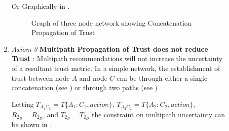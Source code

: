 \begin{itemize}
\begin{enumerate}
\begin{enumerate}
            Or Graphically in .
            \begin{figure}[c!]
              
              \caption{Graph of three node network showing Concatenation Propagation of
              Trust}
              \label{liu2006_concatenation_propagation-dot}
            \end{figure}
          \item \label{Axiom3} \emph{Axiom 3} \textbf{Multipath Propagation of Trust does not reduce Trust} :
            Multipath recommendations will not increase the uncertainty of a
            resultant trust metric. In a simple network, the establishment of
            trust between node \(A\) and node \(C\) can be through either a
            single concatenation (see
            ) or through two
            paths (see )

            Letting \(T_{A_1C_1}=T\{A_1 : C_1, action\}\), \(T_{A_2C_2}=T\{A_2:C_2,
            action\}\), \(R_{2_B}=R_{2_D}\), and \(T_{2_B}=T_{2_D}\) the constraint on multipath uncertainty can be shown in
            .


\end{enumerate}
\end{enumerate}
\end{itemize}
